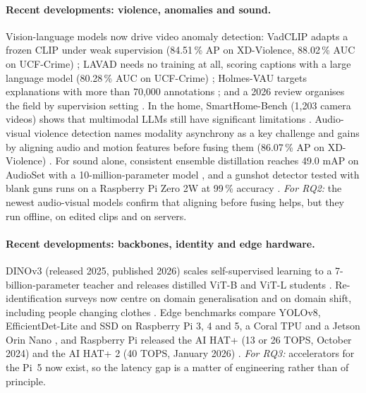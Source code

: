 \paragraph{Recent developments: violence, anomalies and sound.} Vision-language models now drive video anomaly detection: VadCLIP adapts a frozen CLIP under weak supervision (84.51\,\% AP on XD-Violence, 88.02\,\% AUC on UCF-Crime) \cite{wu2024vadclip}; LAVAD needs no training at all, scoring captions with a large language model (80.28\,\% AUC on UCF-Crime) \cite{zanella2024lavad}; Holmes-VAU targets explanations with more than 70,000 annotations \cite{zhang2025holmesvau}; and a 2026 review organises the field by supervision setting \cite{wu2026vadreview}. In the home, SmartHome-Bench (1,203 camera videos) shows that multimodal LLMs still have significant limitations \cite{zhao2025smarthomebench}. Audio-visual violence detection names modality asynchrony as a key challenge \cite{sun2024msbt} and gains by aligning audio and motion features before fusing them (86.07\,\% AP on XD-Violence) \cite{jin2025aligning}. For sound alone, consistent ensemble distillation reaches 49.0 mAP on AudioSet with a 10-million-parameter model \cite{dinkel2024ced}, and a gunshot detector tested with blank guns runs on a Raspberry Pi Zero 2W at 99\,\% accuracy \cite{khan2025gunshot}. \emph{For RQ2:} the newest audio-visual models confirm that aligning before fusing helps, but they run offline, on edited clips and on servers.

\paragraph{Recent developments: backbones, identity and edge hardware.} DINOv3 (released 2025, published 2026) scales self-supervised learning to a 7-billion-parameter teacher and releases distilled ViT-B and ViT-L students \cite{simeoni2025dinov3}. Re-identification surveys now centre on domain generalisation \cite{lee2025dgreid} and on domain shift, including people changing clothes \cite{nguyen2024reidshift}. Edge benchmarks compare YOLOv8, EfficientDet-Lite and SSD on Raspberry Pi 3, 4 and 5, a Coral TPU and a Jetson Orin Nano \cite{alqahtani2024edge}, and Raspberry Pi released the AI HAT+ (13 or 26 TOPS, October 2024) \cite{rpi2024aihat} and the AI HAT+ 2 (40 TOPS, January 2026) \cite{rpi2026aihat2}. \emph{For RQ3:} accelerators for the Pi~5 now exist, so the latency gap is a matter of engineering rather than of principle.

